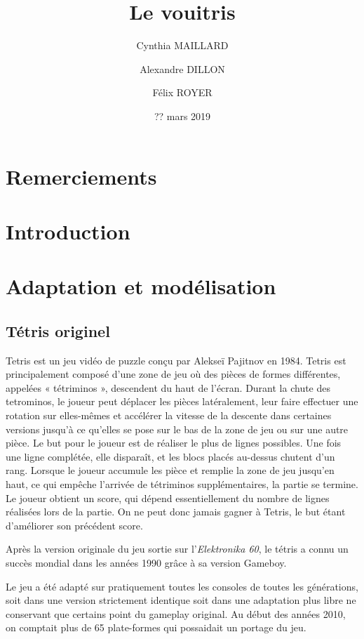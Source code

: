 \documentclass[a4paper, 12pt]{article}
\title{Le vouitris}
\date{?? mars 2019}
\author{Cynthia MAILLARD \and Alexandre DILLON \and Félix ROYER}
\begin{document}
\maketitle

\newpage

\tableofcontents

\newpage

\section*{Remerciements}

\section*{Introduction}

\section{Adaptation et modélisation}
	\subsection{Tétris originel}
		Tetris est un jeu vidéo de puzzle conçu par Alekseï Pajitnov en 1984. Tetris est principalement composé d'une zone de jeu où des pièces de formes différentes, appelées « tétriminos », descendent du haut de l'écran. 
		Durant la chute des tetrominos, le joueur peut déplacer les pièces latéralement, leur faire effectuer une rotation sur elles-mêmes et accélérer la vitesse de la descente dans certaines versions jusqu'à ce qu'elles se pose sur le bas de la zone de jeu ou sur une autre pièce. 
		Le but pour le joueur est de réaliser le plus de lignes possibles. Une fois une ligne complétée, elle disparaît, et les blocs placés au-dessus chutent d'un rang. 
		Lorsque le joueur accumule les pièce et remplie la zone de jeu jusqu’en haut, ce qui empêche l'arrivée de tétriminos supplémentaires, la partie se termine. Le joueur obtient un score, qui dépend essentiellement du nombre de lignes réalisées lors de la partie. On ne peut donc jamais gagner à Tetris, le but étant d’améliorer son précédent score.

		Après la version originale du jeu sortie sur l'\textit{Elektronika 60}, le tétris a connu un succès mondial dans les années 1990 grâce à sa version Gameboy.

		Le jeu a été adapté sur pratiquement toutes les consoles de toutes les générations, soit dans une version strictement identique soit dans une adaptation plus libre ne conservant que certains point du gameplay original. Au début des années 2010, on comptait plus de 65 plate-formes qui possaidait un portage du jeu.
\end{document}
